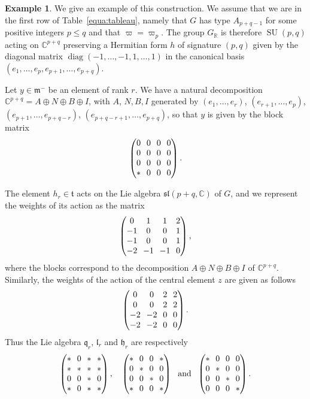 \documentclass[10pt]{amsart}
\theoremstyle{plain}
\theoremstyle{definition}
\newtheorem{exem}[theo]{Example}
\let\rgy r
\DeclareMathOperator{\diag}{diag}
\DeclareMathOperator{\SU}{SU}
\newcommand{\bC}{\mathbb{C}}
\newcommand{\bR}{\mathbb{R}}
\newcommand{\fh}{\mathfrak{h}}
\newcommand{\fl}{\mathfrak{l}}
\newcommand{\fm}{\mathfrak{m}}
\newcommand{\fq}{\mathfrak{q}}
\newcommand{\ft}{\mathfrak{t}}
\newcommand{\fsl}{\mathfrak{sl}}
\begin{document}
\begin{exem}\label{exem:typeA}
We give an example of this construction.
We assume that we are in the first row of Table~\ref{equa:tableau}, namely that $G$ has
type $A_{p+q-1}$ for some positive integers $p\leq q$ and that $\varpi = \varpi_p$. The group $G_\bR$
is therefore $\SU(p,q)$ acting on $\bC^{p+q}$ preserving a Hermitian form $h$ of signature $(p,q)$ given
by the diagonal matrix $\diag(-1,\ldots,-1,1,\ldots,1)$ in the canonical basis
$(e_1,\ldots,e_p,e_{p+1},\ldots,e_{p+q})$.

Let
$y\in\fm^-$ be an element of rank $\rgy$. We have a natural decomposition $\bC^{p+q}=A \oplus N
\oplus B \oplus I$, with $A$, \resp $N,B,I$ generated by $(e_1,\ldots,e_\rgy)$, \resp $(e_{\rgy+1},\ldots,e_p)$, $(e_{p+1},\ldots,e_{p+q-\rgy})$, $(e_{p+q-\rgy+1},\ldots,e_{p+q})$, so
that $y$ is given by the block matrix
$$\arraycolsep3.5pt
\begin{pmatrix}
0 & 0 & 0 & 0 \\
0 & 0 & 0 & 0 \\
0 & 0 & 0 & 0 \\
* & 0 & 0 & 0
\end{pmatrix}.
$$

The element $h_\rgy \in \ft$ acts on the Lie algebra $\fsl(p+q,\bC)$ of $G$, and we represent the weights
of its action as the matrix
$$\arraycolsep3.5pt
\begin{pmatrix}
0 & 1 & 1 & 2 \\
-1 & 0 & 0 & 1 \\
-1 & 0 & 0 & 1 \\
-2 & -1 & -1 & 0
\end{pmatrix},
$$
where the blocks correspond to the decomposition $A \oplus N \oplus B \oplus I$
of $\bC^{p+q}$.
Similarly, the weights of the action of the central element $z$ are given as follows
$$\arraycolsep3.5pt
\begin{pmatrix}
0 & 0 & 2 & 2 \\
0 & 0 & 2 & 2 \\
-2 & -2 & 0 & 0 \\
-2 & -2 & 0 & 0
\end{pmatrix}.
$$
Thus the Lie algebra $\fq_\rgy$, $\fl_\rgy$ and $\fh_\rgy$ are respectively
$$\arraycolsep3.5pt
\begin{pmatrix}
* & 0 & * & * \\
* & * & * & * \\
0 & 0 & * & 0 \\
* & 0 & * & *
\end{pmatrix},\quad
\begin{pmatrix}
* & 0 & 0 & * \\
0 & * & 0 & 0\\
0 & 0 & * & 0 \\
* & 0 & 0 & *
\end{pmatrix}\ \mbox{ and } \
\begin{pmatrix}
* & 0 & 0 & 0 \\
0 & * & 0 & 0\\
0 & 0 & * & 0 \\
0 & 0 & 0 & *
\end{pmatrix}.
$$


\end{exem}
\end{document}
